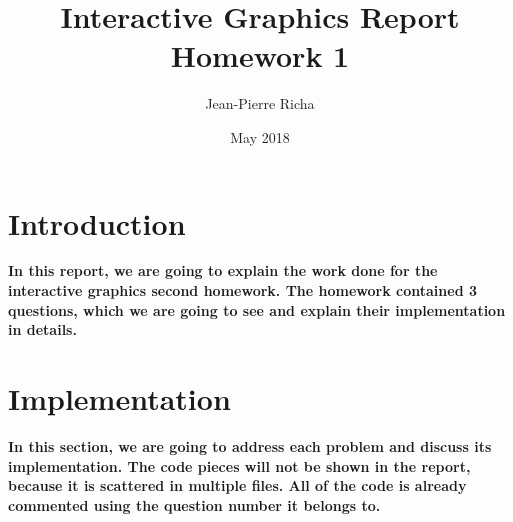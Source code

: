 \documentclass{article}
\begin{document}
\title{Interactive Graphics Report\\
		Homework 1}
\author{Jean-Pierre Richa}
\date{May 2018}
\maketitle
\section {Introduction}
\textbf {In this report, we are going to explain the work done for the interactive graphics second homework.
The homework contained 3 questions, which we are going to see and explain their implementation in details.}

\section {Implementation}
\textbf{In this section, we are going to address each problem and discuss its implementation. The code pieces will not be shown in the report, because it is scattered in multiple files. All of the code is already commented using the question number it belongs to.}
\end{document}
